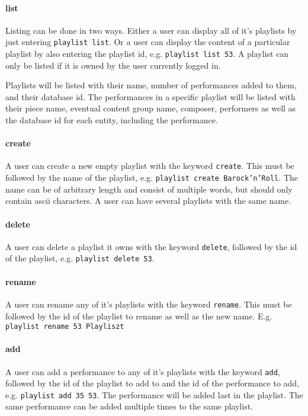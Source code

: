 \paragraph{list}
Listing can be done in two ways. Either a user can display all of it's playlists by just entering
\texttt{playlist list}. Or a user can display the content of a particular playlist by also entering
the playlist id, e.g. \texttt{playlist list 53}. A playlist can only be listed if it is owned by the
user currently logged in.

Playlists will be listed with their name, number of performances added to them, and their database
id.
The performances in a specific playlist will be listed with their piece name, eventual content group
name, composer, performers as well as the database id for each entity, including the performance.

\paragraph{create}
A user can create a new empty playlist with the keyword \texttt{create}. This must be followed by
the name of the playlist, e.g. \texttt{playlist create Barock'n'Roll}. The name can be of arbitrary
length and consist of multiple words, but should only contain ascii characters. A user can have
several playlists with the same name.

\paragraph{delete}
A user can delete a playlist it owns with the keyword \texttt{delete}, followed by the id of the
playlist, e.g. \texttt{playlist delete 53}.

\paragraph{rename}
A user can rename any of it's playlists with the keyword \texttt{rename}. This must be followed by
the id of the playlist to rename as well as the new name. E.g. \texttt{playlist rename 53 Playliszt}

\paragraph{add}
A user can add a performance to any of it's playlists with the keyword \texttt{add}, followed by the
id of the playlist to add to and the id of the performance to add, e.g. \texttt{playlist add 35 53}.
The performance will be added last in the playlist. The same performance can be added multiple times
to the same playlist.

